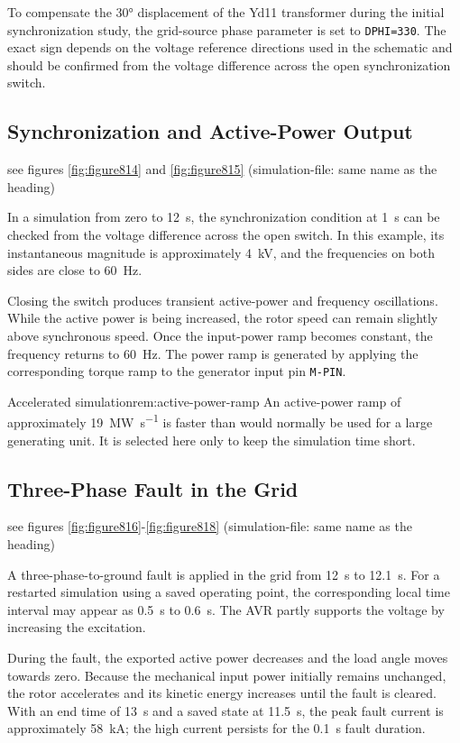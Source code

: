 To compensate the \ang{30} displacement of the Yd11 transformer during the
initial synchronization study, the grid-source phase parameter is set to
\texttt{DPHI=330}. The exact sign depends on the voltage reference directions
used in the schematic and should be confirmed from the voltage difference
across the open synchronization switch.

\subsection{Synchronization and Active-Power Output} see figures \ref{fig:figure814} and \ref{fig:figure815}   (simulation-file: same name as the heading)

In a simulation from zero to \SI{12}{\second}, the synchronization condition
at \SI{1}{\second} can be checked from the voltage difference across the open
switch. In this example, its instantaneous magnitude is approximately
\SI{4}{\kilo\volt}, and the frequencies on both sides are close to
\SI{60}{\hertz}.

Closing the switch produces transient active-power and frequency oscillations.
While the active power is being increased, the rotor speed can remain slightly
above synchronous speed. Once the input-power ramp becomes constant, the
frequency returns to \SI{60}{\hertz}. The power ramp is generated by applying
the corresponding torque ramp to the generator input pin \texttt{M-PIN}.

\begin{remark}{Accelerated simulation}{rem:active-power-ramp}
An active-power ramp of approximately \SI{19}{\mega\watt\per\second} is 
faster than would normally be used for a large generating unit. It is selected
here only to keep the simulation time short.
\end{remark}

\subsection{Three-Phase Fault in the Grid} see figures \ref{fig:figure816}-\ref{fig:figure818}  (simulation-file: same name as the heading)

A three-phase-to-ground fault is applied in the grid from
\SI{12}{\second} to \SI{12.1}{\second}. For a restarted simulation using a
saved operating point, the corresponding local time interval may appear as
\SI{0.5}{\second} to \SI{0.6}{\second}. The AVR partly supports the voltage
by increasing the excitation.

During the fault, the exported active power decreases and the load angle moves
towards zero. Because the mechanical input power initially remains unchanged,
the rotor accelerates and its kinetic energy increases until the fault is
cleared. With an end time of \SI{13}{\second} and a saved state at
\SI{11.5}{\second}, the peak fault current is approximately
\SI{58}{\kilo\ampere}; the high current persists for the
\SI{0.1}{\second} fault duration.


